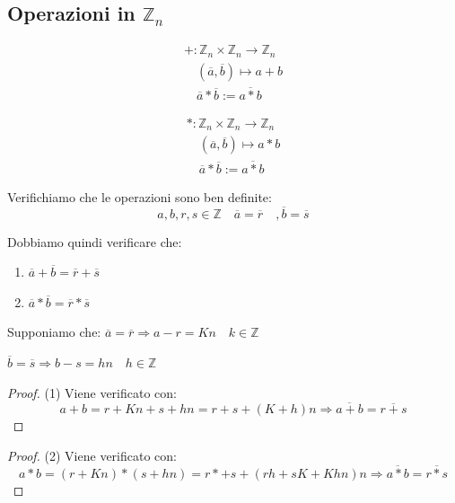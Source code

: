 \documentclass{article}
\theoremstyle{definition}
\begin{document}
\subsection{Operazioni in $\mathbb{Z}_n$}
\begin{align*}
        + : \mathbb{Z}_n \times \mathbb{Z}_n \to \mathbb{Z}_n \\
        \quad (\overline{a}, \overline{b}) \mapsto a + b \\
        \quad \overline{a} * \overline{b} := \overline{a * b}
\end{align*}

\begin{align*}
        * : \mathbb{Z}_n \times \mathbb{Z}_n \to \mathbb{Z}_n \\
        \quad (\overline{a}, \overline{b}) \mapsto a * b \\
        \quad \overline{a} * \overline{b} := \overline{a * b}
\end{align*}


Verifichiamo che le operazioni sono ben definite:
\begin{equation*}
        a,b,r,s \in \mathbb{Z} \quad \overline{a} = \overline{r} \quad ,\overline{b} = \overline{s}
\end{equation*}

Dobbiamo quindi verificare che:
\begin{enumerate}
        \item $\overline{a} + \overline{b} = \overline{r} + \overline{s}$  
        \item $\overline{a} * \overline{b} = \overline{r} * \overline{s}$  
\end{enumerate}


Supponiamo che:
$\overline{a} = \overline{r} \Rightarrow a - r = Kn \quad k \in \mathbb{Z}$ \par 
$\overline{b} = \overline{s} \Rightarrow b - s = hn \quad h \in \mathbb{Z}$ \par 

\begin{proof}
        (1) Viene verificato con:
       \begin{equation*}
               a + b = r + Kn + s + hn = r+s + (K+h)n \Rightarrow \overline{a+b} = \overline{r + s}
       \end{equation*}
\end{proof}

\begin{proof}
       (2) Viene verificato con:
       \begin{equation*}
               a * b = (r + Kn) * (s + hn) = r*+s + (rh +sK + Khn)n \Rightarrow \overline{a*b} = \overline{r * s}
       \end{equation*}
\end{proof}
\end{document}
